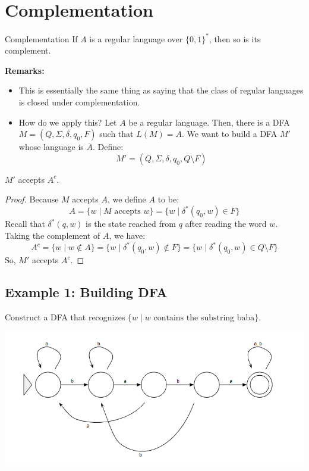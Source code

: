 \documentclass[letterpaper]{article}
\begin{document}
\section{Complementation}
\begin{theorem}{Complementation}{}
    If $A$ is a regular language over $\{0, 1\}^*$, then so is its complement. 
\end{theorem}
\textbf{Remarks:}
\begin{itemize}
    \item This is essentially the same thing as saying that the class of regular languages is closed under complementation.
    \item How do we apply this? Let $A$ be a regular language. Then, there is a DFA $M = (Q, \Sigma, \delta, q_0, F)$ such that $L(M) = A$. We want to build a DFA $M'$ whose language is $\overline{A}$. Define: 
    \[M' = (Q, \Sigma, \delta, q_0, Q \setminus F)\]
\end{itemize}

\begin{proposition}
    $M'$ accepts $A^c$.
\end{proposition}

\begin{mdframed}[]
    \begin{proof}
        Because $M$ accepts $A$, we define $A$ to be: 
        \[A = \{w \mid M \text{ accepts } w\} = \{w \mid \delta^{*}(q_0, w) \in F\}\]
        Recall that $\delta^{*}(q, w)$ is the state reached from $q$ after reading the word $w$. Taking the complement of $A$, we have: 
        \[A^c = \{w \mid w \notin A\} = \{w \mid \delta^{*}(q_0, w) \notin F\} = \{w \mid \delta^{*}(q_0, w) \in Q \setminus F\}\]
        So, $M'$ accepts $A^c$. 
    \end{proof}
\end{mdframed}

\newpage 
\subsection{Example 1: Building DFA}
Construct a DFA that recognizes $\{w \mid w \text{ contains the substring baba}\}$.

\begin{mdframed}[]
    \begin{center}
        \includegraphics[scale=0.7]{../assets/baba_state.png}
    \end{center}
\end{mdframed}
\end{document}
